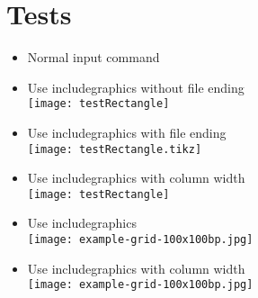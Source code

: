 \documentclass[twocolumn]{article}
\begin{document}
	\section*{Tests}
	\begin{itemize}
		\item Normal input command\\%
		\item Use includegraphics without file ending\\%
			\texttt{[image: testRectangle]}%
		\item Use includegraphics with file ending\\%
			\texttt{[image: testRectangle.tikz]}%
		\item Use includegraphics with column width\\%
			\texttt{[image: testRectangle]}%
		\item Use includegraphics\\%
			\texttt{[image: example-grid-100x100bp.jpg]}%
		\item Use includegraphics with column width\\%
			\texttt{[image: example-grid-100x100bp.jpg]}%


	\end{itemize}
\end{document}
